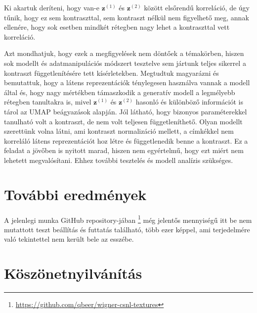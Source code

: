 \documentclass[12pt, english]{article}
\begin{document}
\par Ki akartuk deríteni, hogy van-e $\bm{z}^{(1)}$ és $\bm{z}^{(2)}$ között elsőrendű korreláció, de úgy tűnik, hogy ez sem kontraszttal, sem kontraszt nélkül nem figyelhető meg, annak ellenére, hogy sok esetben mindkét rétegben nagy lehet a kontraszttal vett korreláció.

\vspace{4mm}

\par Azt mondhatjuk, hogy ezek a megfigyelések nem döntőek a témakörben, hiszen sok modellt és adatmanipulációs módszert tesztelve sem jártunk teljes sikerrel a kontraszt függetlenítésére tett kísérletekben. Megtudtuk magyarázni és bemutattuk, hogy a látens reprezentációk ténylegesen használva vannak a modell által és, hogy nagy mértékben támaszkodik a generatív modell a legmélyebb rétegben tanultakra is, mivel  $\bm{z}^{(1)}$ és $\bm{z}^{(2)}$ hasonló és különböző információt is tárol az UMAP beágyazások alapján. Jól látható, hogy bizonyos paraméterekkel tanulható volt a kontraszt, de nem volt teljesen függetleníthető. Olyan modellt szerettünk volna látni, ami kontraszt normalizáció mellett, a címkékkel nem korreláló látens reprezentációt hoz létre és függetlenedik benne a kontraszt. Ez a feladat a jövőben is nyitott marad, hiszen nem egyértelmű, hogy ezt miért nem lehetett megvalósítani. Ehhez további tesztelés és modell analízis szükséges.

\vspace{7mm}

\section{További eredmények}

\vspace{7mm}

\par A jelenlegi munka GitHub repository-jában \footnote{\url{https://github.com/qbeer/wigner-csnl-textures}} még jelentős mennyiségű itt be nem mutattott teszt beállítás és futtatás található, több ezer képpel, ami terjedelmére való tekintettel nem került bele az esszébe.

\vspace{7mm}

\section{Köszönetnyilvánítás}

\vspace{7mm}
\end{document}
